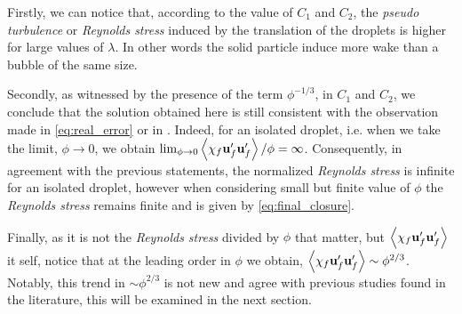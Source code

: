 Firstly, we can notice that, according to the value of $C_1$ and $C_2$, the \textit{pseudo turbulence} or \textit{Reynolds stress} induced by the translation of the droplets is higher for large values of $\lambda$. 
In other words the solid particle induce more wake than a bubble of the same size. 

Secondly, as witnessed by the presence of the term $\phi^{-1/3}$, in $C_1$ and $C_2$, we conclude that the solution obtained here is still consistent with the observation made in \ref{eq:real_error} or in \citet{caflisch1985variance}. 
Indeed, for an isolated droplet, i.e. when we take the limit, $\phi \to 0$, we obtain $\lim_{\phi \to 0} \left<\chi_f \textbf{u}_f' \textbf{u}_f'\right> / \phi = \infty$. 
Consequently, in agreement with the previous statements, the normalized \textit{Reynolds stress} is infinite for an isolated droplet, however when considering small but finite value of $\phi$ the \textit{Reynolds stress} remains finite and is given by \ref{eq:final_closure}. 

Finally, as it is not the \textit{Reynolds stress} divided by $\phi$ that matter, but $\left<\chi_f\textbf{u}_f'\textbf{u}_f'\right>$ it self, notice that at the leading order in $\phi$ we obtain,  $\left<\chi_f\textbf{u}_f'\textbf{u}_f'\right>\sim\phi^{2/3}$. 
Notably, this  trend in $\sim\phi^{2/3}$ is not new and agree with previous studies found in the literature, this will be examined in the next section. 

